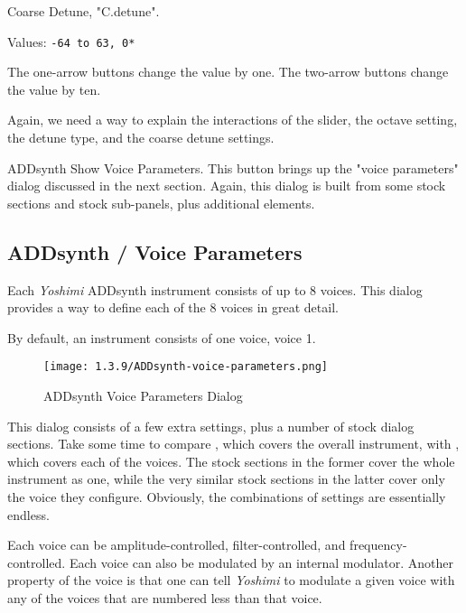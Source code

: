    Coarse Detune, "C.detune".

   Values: \texttt{-64 to 63, 0*}

   The one-arrow buttons change the value by one.
   The two-arrow buttons change the value by ten.

   Again, we need a way to explain the interactions of the slider, the
   octave setting, the detune type, and the coarse detune settings.

   ADDsynth Show Voice Parameters.
   This button brings up the "voice parameters" dialog discussed in the next
   section.
   Again, this dialog is built from some stock sections and stock
   sub-panels, plus additional elements.

\subsection{ADDsynth / Voice Parameters}
\label{subsec:addsynth_voice_parameters}

   Each \textsl{Yoshimi} ADDsynth instrument consists of up to 8 voices.
   This dialog provides a way to define each of the 8 voices in great
   detail.

   By default, an instrument consists of one voice, voice 1.

\begin{figure}[H]
   \centering 
   \texttt{[image: 1.3.9/ADDsynth-voice-parameters.png]}
   \caption{ADDsynth Voice Parameters Dialog}
   \label{fig:addsynth_voice_parameters_dialog}
\end{figure}

   This dialog consists of a few extra settings, plus a number of
   stock dialog sections.  Take some time to compare
   ,
   which covers the overall instrument, with 
   ,
   which covers each of the voices.
   The stock sections in the former cover the whole instrument as one,
   while the very similar stock sections in the latter cover only the
   voice they configure.
   Obviously, the combinations of settings are essentially endless.

   Each voice can be amplitude-controlled, filter-controlled, and
   frequency-controlled.  Each voice can also be modulated by an
   internal modulator.
   Another property of the voice is that one can tell \textsl{Yoshimi}
   to modulate a given voice with any of the voices that are numbered less
   than that voice.

